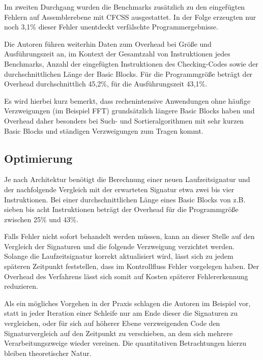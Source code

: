 \documentclass[11pt]{article}
\begin{document}
Im zweiten Durchgang wurden die Benchmarks zusätzlich zu den eingefügten
Fehlern auf Assemblerebene mit CFCSS ausgestattet. In der Folge erzeugten nur
noch 3,1\% dieser Fehler unentdeckt verfälschte Programmergebnisse.

Die Autoren führen weiterhin Daten zum Overhead bei Größe und Ausführungszeit
an, im Kontext der Gesamtzahl von Instruktionen jedes Benchmarks, Anzahl der
eingefügten Instruktionen des Checking-Codes sowie der durchschnittlichen Länge
der Basic Blocks. Für die Programmgröße beträgt der Overhead durchschnittlich
45,2\%, für die Ausführungszeit 43,1\%.

Es wird hierbei kurz bemerkt, dass rechenintensive Anwendungen ohne häufige
Verzweigungen (im Beispiel FFT) grundsätzlich längere Basic Blocks haben und
Overhead daher besonders bei Such- und Sortieralgorithmen mit sehr kurzen Basic
Blocks und ständigen Verzweigungen zum Tragen kommt.


\subsection{Optimierung}

Je nach Architektur benötigt die Berechnung einer neuen Laufzeitsignatur und
der nachfolgende Vergleich mit der erwarteten Signatur etwa zwei bis vier
Instruktionen. Bei einer durchschnittlichen Länge eines Basic Blocks von z.B.
sieben bis acht Instruktionen beträgt der Overhead für die Programmgröße
zwischen 25\% und 43\%. %

Falls Fehler nicht sofort behandelt werden müssen, kann an dieser Stelle auf
den Vergleich der Signaturen und die folgende Verzweigung verzichtet werden.
Solange die Laufzeitsignatur korrekt aktualisiert wird, lässt sich zu jedem
späteren Zeitpunkt feststellen, dass im Kontrollfluss Fehler vorgelegen haben.
Der Overhead des Verfahrens lässt sich somit auf Kosten späterer
Fehlererkennung reduzieren.

Als ein mögliches Vorgehen in der Praxis schlagen die Autoren im Beispiel vor,
statt in jeder Iteration einer Schleife nur am Ende dieser die Signaturen zu
vergleichen, oder für sich auf höherer Ebene verzweigenden Code den
Signaturvergleich auf den Zeitpunkt zu verschieben, an dem sich mehrere
Verarbeitungszweige wieder vereinen. Die quantitativen Betrachtungen hierzu
bleiben theoretischer Natur.

\pagebreak


\end{document}
